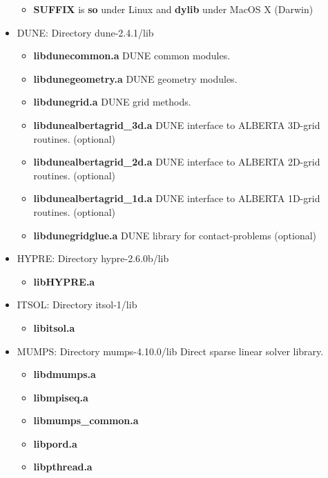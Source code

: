 \documentclass[11pt]{article}
\begin{document}
\begin{itemize}
\begin{itemize}
\item {\bf SUFFIX} is {\bf so} under Linux and {\bf dylib} under MacOS X (Darwin)
\end{itemize}
\item DUNE: Directory dune-2.4.1/lib
\begin{itemize}
\item  {\bf libdunecommon.a} \newline
       DUNE common modules.
\item  {\bf libdunegeometry.a} \newline
       DUNE geometry modules.
\item  {\bf libdunegrid.a} \newline
       DUNE grid methods.
\item  {\bf libdunealbertagrid\_3d.a} \newline
       DUNE interface to ALBERTA 3D-grid routines. (optional)
\item  {\bf libdunealbertagrid\_2d.a} \newline
       DUNE interface to ALBERTA 2D-grid routines. (optional)
\item  {\bf libdunealbertagrid\_1d.a} \newline
       DUNE interface to ALBERTA 1D-grid routines. (optional) 
\item  {\bf libdunegridglue.a} \newline
       DUNE library for contact-problems (optional)
\end{itemize}
\item HYPRE: Directory hypre-2.6.0b/lib
\begin{itemize}
\item  {\bf libHYPRE.a}
\end{itemize}
\item ITSOL: Directory itsol-1/lib
\begin{itemize}
\item  {\bf libitsol.a}
\end{itemize}
\item MUMPS: Directory mumps-4.10.0/lib \newline
      Direct sparse linear solver library.
\begin{itemize}
\item  {\bf libdmumps.a}
\item  {\bf libmpiseq.a}
\item  {\bf libmumps\_common.a}
\item  {\bf libpord.a}
\item  {\bf libpthread.a}

\end{itemize}
\end{itemize}
\end{document}

